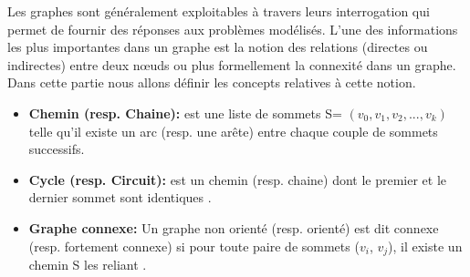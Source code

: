  
 
Les graphes sont généralement exploitables à travers leurs interrogation qui permet de fournir des réponses aux problèmes modélisés. L'une des informations les plus importantes dans un graphe est la notion des relations (directes ou indirectes) entre deux nœuds ou plus formellement la connexité dans un graphe. Dans cette partie nous allons définir les concepts relatives à cette notion.
 \begin{itemize} [label = $\bullet$]
			 \item \textbf{Chemin (resp. Chaine):}
			est une liste de sommets S= $(v_{0},v_{1},v_{2},...,v_{k})$ telle qu'il existe un arc (resp. une arête) entre chaque couple de sommets successifs.
			 
			 
			  \item \textbf{Cycle (resp. Circuit):} 
			 est un chemin (resp. chaine) dont le premier et le dernier sommet sont identiques \citep{DUT}.
			 
			 \item \textbf{Graphe connexe:}
			Un graphe non orienté (resp. orienté) est dit connexe (resp. fortement connexe) si pour toute paire de sommets ($v_{i}$, $v_{j}$), il existe un chemin S les reliant \citep{muller}.
		
		\end{itemize}